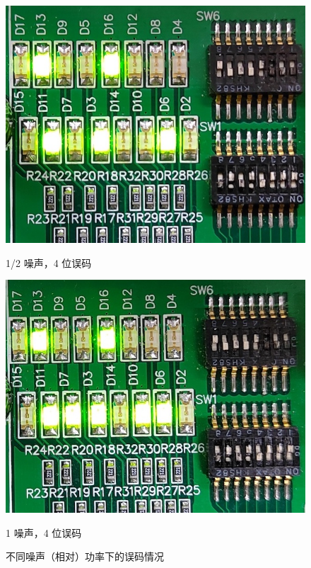 \begin{figure}[h!]
\begin{center}
    	\begin{minipage}{0.48\linewidth}
    		\centerline{\includegraphics[width=\textwidth]{static/result_noise_1_2.jpg}}
    		\centerline{1/2 噪声，4 位误码}
    	\end{minipage}
        \hfill
        \begin{minipage}{0.48\linewidth}
    		\centerline{\includegraphics[width=\textwidth]{static/result_noise_1_1.jpg}}
    		\centerline{1 噪声，4 位误码}
    	\end{minipage}
    	\caption{不同噪声（相对）功率下的误码情况}
    	\label{fig:ber_results}
    \end{center}
\end{figure}

